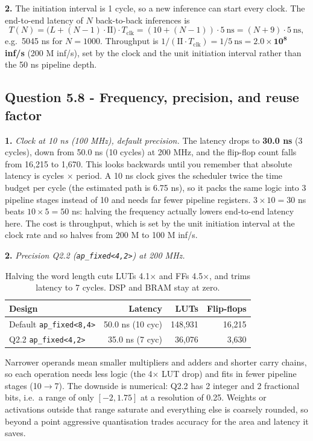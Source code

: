 \documentclass[11pt,a4paper]{article}
\newcommand{\Q}[1]{\subsection*{Question #1}}
\newcommand{\Qpart}[1]{\textbf{#1.}}
\begin{document}
\Qpart{2} The initiation interval is 1 cycle, so a new inference can start every clock. The end-to-end latency of $N$ back-to-back inferences is
\[
T(N) = \big(L + (N-1)\cdot\text{II}\big)\cdot T_{\text{clk}} = (10 + (N-1))\cdot 5\ \text{ns} = (N+9)\cdot 5\ \text{ns},
\]
e.g.\ 5045 ns for $N=1000$. Throughput is $1/(\text{II}\cdot T_{\text{clk}}) = 1/5\ \text{ns} = \mathbf{2.0\times10^{8}}$ \textbf{inf/s} (200 M inf/s), set by the clock and the unit initiation interval rather than the 50 ns pipeline depth.

\Q{5.8 - Frequency, precision, and reuse factor}

\Qpart{1} \textit{Clock at 10 ns (100 MHz), default precision.} The latency drops to \textbf{30.0 ns} (3 cycles), down from 50.0 ns (10 cycles) at 200 MHz, and the flip-flop count falls from 16{,}215 to 1{,}670. This looks backwards until you remember that absolute latency is cycles $\times$ period. A 10 ns clock gives the scheduler twice the time budget per cycle (the estimated path is 6.75 ns), so it packs the same logic into 3 pipeline stages instead of 10 and needs far fewer pipeline registers. $3\times10 = 30$ ns beats $10\times5 = 50$ ns: halving the frequency actually lowers end-to-end latency here. The cost is throughput, which is set by the unit initiation interval at the clock rate and so halves from 200 M to 100 M inf/s.

\Qpart{2} \textit{Precision Q2.2 (\texttt{ap\_fixed<4,2>}) at 200 MHz.}

\begin{table}[h]
\centering
\small
\begin{tabular}{lrrr}
\toprule
Design & Latency & LUTs & Flip-flops \\
\midrule
Default \texttt{ap\_fixed<8,4>} & 50.0 ns (10 cyc) & 148{,}931 & 16{,}215 \\
Q2.2 \texttt{ap\_fixed<4,2>} & 35.0 ns (7 cyc) & 36{,}076 & 3{,}630 \\
\bottomrule
\end{tabular}
\caption{Halving the word length cuts LUTs 4.1$\times$ and FFs 4.5$\times$, and trims latency to 7 cycles. DSP and BRAM stay at zero.}
\end{table}

Narrower operands mean smaller multipliers and adders and shorter carry chains, so each operation needs less logic (the 4$\times$ LUT drop) and fits in fewer pipeline stages (10$\to$7). The downside is numerical: Q2.2 has 2 integer and 2 fractional bits, i.e.\ a range of only $[-2, 1.75]$ at a resolution of 0.25. Weights or activations outside that range saturate and everything else is coarsely rounded, so beyond a point aggressive quantisation trades accuracy for the area and latency it saves.
\end{document}
